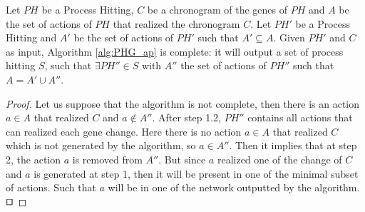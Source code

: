 %

\begin{theorem}[Completeness]%
	\label{th:correct}
	Let $PH$ be a Process Hitting, $C$ be a chronogram of the genes of $PH$ and $A$ be the set of actions of $PH$ that realized the chronogram $C$.
	Let $PH'$ be a Process Hitting and $A'$ be the set of actions of $PH'$ such that $A' \subseteq A$.
	Given $PH'$ and $C$ as input, Algorithm \ref{alg:PHG_ap} is complete:
	it will output a set of process hitting $S$,
	such that $\exists PH'' \in S$ with $A''$ the set of actions of $PH''$ such that $A = A' \cup A''$.
	\begin{proof}
	Let us suppose that the algorithm is not complete, then there is an action $a \in A$ that realized $C$ and $a \not \in A''$.
	After step 1.2, $PH''$ contains all actions that can realized each gene change.
	Here there is no action $a \in A$ that realized $C$ which is not generated by the algorithm, so $a \in A''$.
	Then it implies that at step 2, the action $a$ is removed from $A''$.
	But since $a$ realized one of the change of $C$ and $a$ is generated at step 1, then it will be present in one of the minimal subset of actions.
	Such that $a$ will be in one of the network outputted by the algorithm.
	$\qed$
	\end{proof}
\end{theorem}


